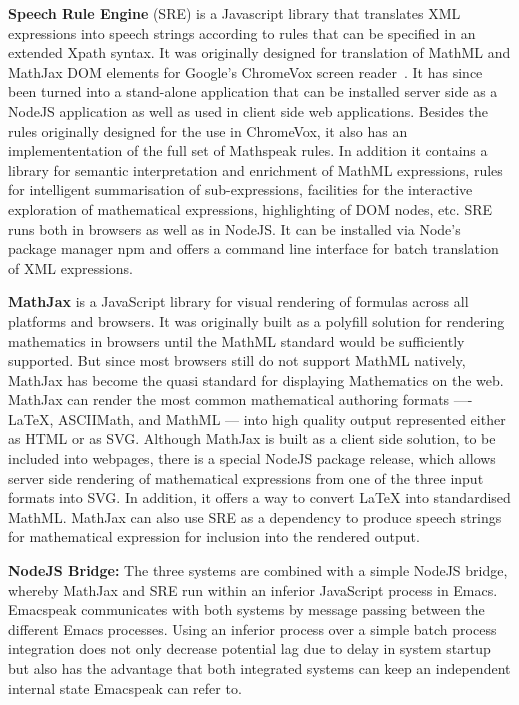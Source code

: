 \documentclass{sig-alternate-05-2015}
\newcommand{\latex}{\LaTeX\xspace}
\newcommand{\sre}{SRE\xspace}
\def\latex{\LaTeX}
\begin{document}
\textbf{Speech Rule Engine} (\sre) is a Javascript library that translates XML
expressions into speech strings according to rules that can be specified in an
extended Xpath syntax. It was originally designed for translation of MathML and
MathJax DOM elements for Google's ChromeVox screen reader~\cite{Sorge14}. It has
since been turned into a stand-alone application that can be installed server
side as a NodeJS application as well as used in client side web applications.
Besides the rules originally designed for the use in ChromeVox, it also has an
implemententation of the full set of Mathspeak rules. In addition it contains a
library for semantic interpretation and enrichment of MathML expressions, rules
for intelligent summarisation of sub-expressions, facilities for the interactive
exploration of mathematical expressions, highlighting of DOM nodes, etc.  SRE
runs both in browsers as well as in NodeJS. It can be installed via Node's
package manager npm and offers a command line interface for batch translation of
XML expressions.


\textbf{MathJax} is a JavaScript library for visual rendering of formulas across
all platforms and browsers. It was originally built as a polyfill solution for
rendering mathematics in browsers until the MathML standard would be
sufficiently supported. But since most browsers still do not support MathML
natively, MathJax has become the quasi standard for displaying Mathematics on
the web.  MathJax can render the most common mathematical authoring formats ----
{\latex}, ASCIIMath, and MathML --- into high quality output represented either
as HTML or as SVG.  Although MathJax is built as a client side solution, to be
included into webpages, there is a special NodeJS package release, which allows
server side rendering of mathematical expressions from one of the three input
formats into SVG. In addition, it offers a way to convert {\latex} into
standardised MathML. MathJax can also use \sre as a dependency to produce speech
strings for mathematical expression for inclusion into the rendered output.

\textbf{NodeJS Bridge:} The three systems are combined with a simple NodeJS
bridge, whereby MathJax and \sre run within an inferior JavaScript process in
Emacs. Emacspeak communicates with both systems by message passing
between the different Emacs processes.  Using an inferior process over a simple
batch process integration does not only decrease potential lag due to delay in
system startup but also has the advantage that both integrated systems can keep
an independent internal state Emacspeak can refer to.
\end{document}

